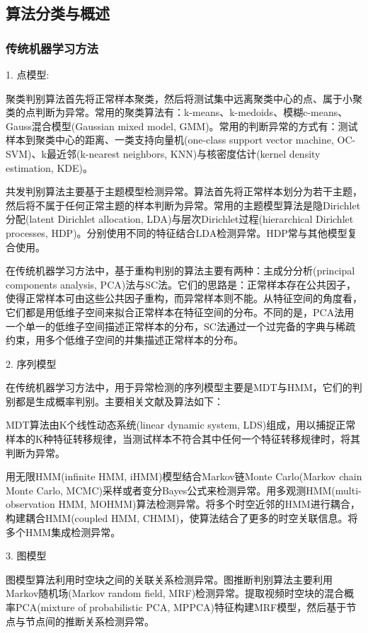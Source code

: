 \documentclass[UTF8]{ctexart}
\begin{document}
\subsection{算法分类与概述}
\subsubsection{传统机器学习方法}
1. 点模型:

聚类判别算法首先将正常样本聚类，然后将测试集中远离聚类中心的点、属于小聚类的点判断为异常。常用的聚类算法有：k-means、k-medoids、模糊c-means、Gauss混合模型(Gaussian mixed model, GMM)。常用的判断异常的方式有：测试样本到聚类中心的距离、一类支持向量机(one-class support vector machine, OC-SVM)、k最近邻(k-nearest neighbors, KNN)与核密度估计(kernel density estimation, KDE)。

共发判别算法主要基于主题模型检测异常。算法首先将正常样本划分为若干主题，然后将不属于任何正常主题的样本判断为异常。常用的主题模型算法是隐Dirichlet分配(latent Dirichlet allocation, LDA)与层次Dirichlet过程(hierarchical Dirichlet processes, HDP)。分别使用不同的特征结合LDA检测异常。HDP常与其他模型复合使用。

在传统机器学习方法中，基于重构判别的算法主要有两种：主成分分析(principal components analysis, PCA)法与SC法。它们的思路是：正常样本存在公共因子，使得正常样本可由这些公共因子重构，而异常样本则不能。从特征空间的角度看，它们都是用低维子空间来拟合正常样本在特征空间的分布。不同的是，PCA法用一个单一的低维子空间描述正常样本的分布，SC法通过一个过完备的字典与稀疏约束，用多个低维子空间的并集描述正常样本的分布。

2. 序列模型

在传统机器学习方法中，用于异常检测的序列模型主要是MDT与HMM，它们的判别都是生成概率判别。主要相关文献及算法如下：

MDT算法由K个线性动态系统(linear dynamic system, LDS)组成，用以捕捉正常样本的K种特征转移规律，当测试样本不符合其中任何一个特征转移规律时，将其判断为异常。

用无限HMM(infinite HMM, iHMM)模型结合Markov链Monte Carlo(Markov chain Monte Carlo, MCMC)采样或者变分Bayes公式来检测异常。用多观测HMM(multi-observation HMM, MOHMM)算法检测异常。将多个时空近邻的HMM进行耦合，构建耦合HMM(coupled HMM, CHMM)，使算法结合了更多的时空关联信息。将多个HMM集成检测异常。

3. 图模型

图模型算法利用时空块之间的关联关系检测异常。图推断判别算法主要利用Markov随机场(Markov random field, MRF)检测异常。提取视频时空块的混合概率PCA(mixture of probabilistic PCA, MPPCA)特征构建MRF模型，然后基于节点与节点间的推断关系检测异常。
\end{document}
